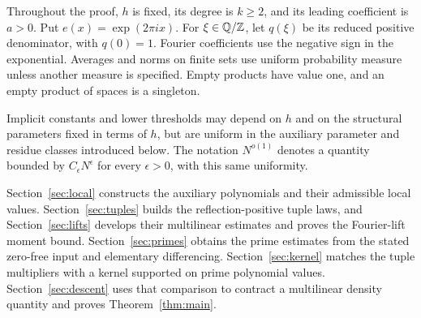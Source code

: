 Throughout the proof, $h$ is fixed, its degree is $k\ge2$, and its
leading coefficient is $a>0$. Put $e(x)=\exp(2\pi i x)$.
For $\xi\in\mathbb Q/\mathbb Z$, let $q(\xi)$ be its reduced positive denominator,
with $q(0)=1$. Fourier coefficients use the negative sign in the
exponential. Averages and norms on finite sets use uniform probability
measure unless another measure is specified. Empty products have
value one, and an empty product of spaces is a singleton.

Implicit constants and lower thresholds may depend on $h$ and on the
structural parameters fixed in terms of $h$, but are uniform in the
auxiliary parameter and residue classes introduced below. The notation
$N^{o(1)}$ denotes a quantity bounded by $C_\epsilon N^\epsilon$ for
every $\epsilon>0$, with this same uniformity.

Section~\ref{sec:local} constructs the auxiliary polynomials and their
admissible local values. Section~\ref{sec:tuples} builds the
reflection-positive tuple laws, and Section~\ref{sec:lifts} develops
their multilinear estimates and proves the Fourier-lift moment bound.
Section~\ref{sec:primes} obtains the prime estimates from the stated
zero-free input and elementary differencing. Section~\ref{sec:kernel}
matches the tuple multipliers with a kernel supported on prime
polynomial values. Section~\ref{sec:descent} uses that comparison to
contract a multilinear density quantity and proves
Theorem~\ref{thm:main}.
